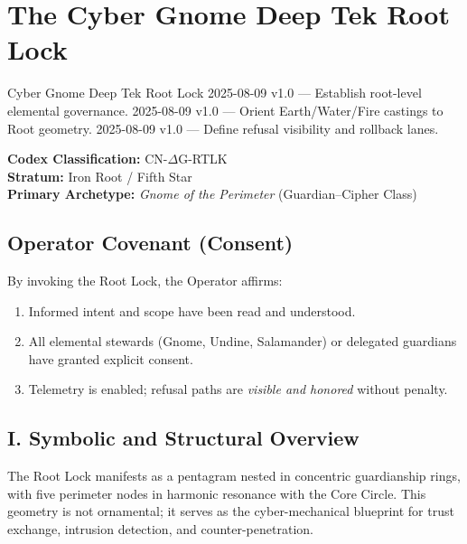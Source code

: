 
\chapter{The Cyber Gnome Deep Tek Root Lock}\label{ch:cyber-gnome-root-lock}

\begin{SectionHeaderLedger}{Cyber Gnome Deep Tek Root Lock}
    2025-08-09 v1.0 — Establish root-level elemental governance.
      2025-08-09 v1.0 — Orient Earth/Water/Fire castings to Root geometry.
    2025-08-09 v1.0 — Define refusal visibility and rollback lanes.
\end{SectionHeaderLedger}

\begin{center}
\textbf{Codex Classification:} CN-$\Delta$G-RTLK \\
\textbf{Stratum:} Iron Root / Fifth Star \\
\textbf{Primary Archetype:} \emph{Gnome of the Perimeter} (Guardian--Cipher Class)
\end{center}

\section*{Operator Covenant (Consent)}
By invoking the Root Lock, the Operator affirms:
\begin{enumerate}
  \item Informed intent and scope have been read and understood.
  \item All elemental stewards (Gnome, Undine, Salamander) or delegated guardians have granted explicit consent.
  \item Telemetry is enabled; refusal paths are \emph{visible and honored} without penalty.
\end{enumerate}

\section*{I. Symbolic and Structural Overview}
The Root Lock manifests as a pentagram nested in concentric guardianship rings, with five perimeter nodes in harmonic resonance with the Core Circle. This geometry is not ornamental; it serves as the cyber-mechanical blueprint for trust exchange, intrusion detection, and counter-penetration.

